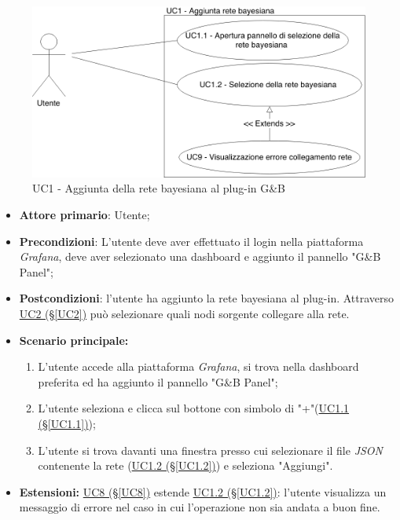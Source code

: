\begin{figure}[H]
	\begin{center}
		\includegraphics[scale=0.4]{./images/UC1.png}
		 \caption{UC1 - Aggiunta della rete bayesiana al plug-in G\&B}	
	\end{center}
\end{figure}
\begin{itemize}
	\item \textbf{Attore primario}: Utente;
	\item \textbf{Precondizioni}: L'utente deve aver effettuato il login nella piattaforma \textit{Grafana}, deve aver selezionato una dashboard e aggiunto il pannello "G\&B Panel";
	\item \textbf{Postcondizioni}: l'utente ha aggiunto la rete bayesiana al plug-in. Attraverso \hyperref[UC2]{UC2 (§\ref*{UC2})} può selezionare quali nodi sorgente collegare alla rete.
	\item \textbf{Scenario principale:}
	\begin{enumerate}
		\item L'utente accede alla piattaforma \textit{Grafana}, si trova nella dashboard preferita ed ha aggiunto il pannello "G\&B Panel";
		\item L'utente seleziona e clicca sul bottone con simbolo di "+"(\hyperref[UC1.1]{UC1.1 (§\ref*{UC1.1})});
		\item L'utente si trova davanti una finestra presso cui selezionare il file \textit{JSON} contenente la rete (\hyperref[UC1.2]{UC1.2 (§\ref*{UC1.2})}) e seleziona "Aggiungi".
	\end{enumerate}
	\item \textbf{Estensioni:} \hyperref[UC8]{UC8 (§\ref*{UC8})} estende \hyperref[UC1.2]{UC1.2 (§\ref*{UC1.2})}: l'utente visualizza un messaggio di errore nel caso in cui l'operazione non sia andata a buon fine.
\end{itemize}

